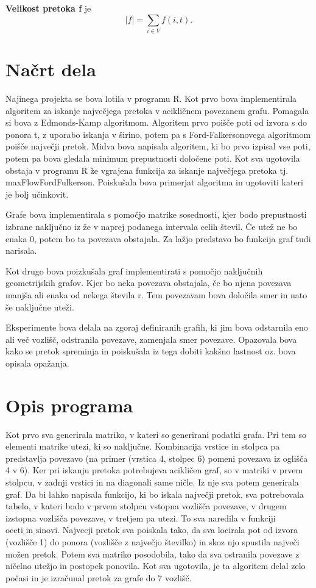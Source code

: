 \documentclass[a4paper]{article}
\begin{document}
\textbf{Velikost pretoka f} je $$|f|= \sum_{i \in V} f(i,t). $$


\section{Načrt dela}

Najinega projekta se bova lotila v programu R. Kot prvo bova implementirala algoritem za iskanje največjega pretoka v acikličnem povezanem grafu. Pomagala si  bova z Edmonds-Kamp algoritmom. Algoritem prvo poišče poti od izvora s do ponora t, z uporabo iskanja v širino, potem pa s  Ford-Falkersonovega algoritmom poišče največji pretok. Midva bova napisala algoritem, ki bo prvo izpisal vse poti, potem pa bova gledala minimum prepustnosti določene poti. Kot sva ugotovila obstaja v programu R že vgrajena funkcija za iskanje največjega pretoka tj. maxFlowFordFulkerson. Poiskušala bova primerjat algoritma in ugotoviti kateri je bolj učinkovit. 

Grafe bova implementirala s pomočjo matrike sosednosti, kjer bodo prepustnosti izbrane naključno iz že v naprej podanega intervala celih števil. Če utež ne bo enaka 0, potem bo ta povezava obstajala. Za lažjo predstavo bo funkcija graf tudi narisala. 

Kot drugo bova poizkušala graf implementirati s pomočjo naključnih geometrijskih grafov. Kjer bo neka povezava obstajala, če bo njena povezava manjša ali enaka od nekega števila r. Tem povezavam bova določila smer in nato še naključne uteži.

Eksperimente bova delala na zgoraj definiranih grafih, ki jim bova odstarnila eno ali več vozlišč, odstranila povezave, zamenjala smer povezave. Opazovala bova kako se pretok spreminja in poiskušala iz tega dobiti kakšno lastnost oz. bova opisala opažanja. 

\section{Opis programa}

Kot prvo sva generirala matriko, v kateri so generirani podatki grafa. Pri tem so elementi matrike utezi, ki so naključne. Kombinacija vrstice in stolpca pa predstavlja povezavo (na primer (vrstica 4, stolpec 6) pomeni povezava iz oglišča 4 v 6). Ker pri iskanju pretoka potrebujeva acikličen graf, so v matriki v prvem stolpcu, v zadnji vrstici in na diagonali same ničle. Iz nje sva potem generirala graf. Da bi lahko napisala funkcijo, ki bo iskala največji pretok, sva potrebovala tabelo, v kateri bodo v prvem stolpcu vstopna vozlišča povezave, v drugem izstopna vozlišča povezave, v tretjem pa utezi. To sva naredila v funkciji $\text{oceti\_in\_sinovi}$. Najvecji pretok sva poiskala tako, da sva locirala pot od izvora (vozlišče 1) do ponora (vozlišče z največjo številko) in skoz njo spustila največi možen pretok. Potem sva matriko posodobila, tako da sva ostranila povezave z ničelno utežjo in postopek ponovila. Kot sva ugotovila, je ta algoritem delal zelo počasi in je izračunal pretok za grafe do 7 vozlišč. 
\end{document}
